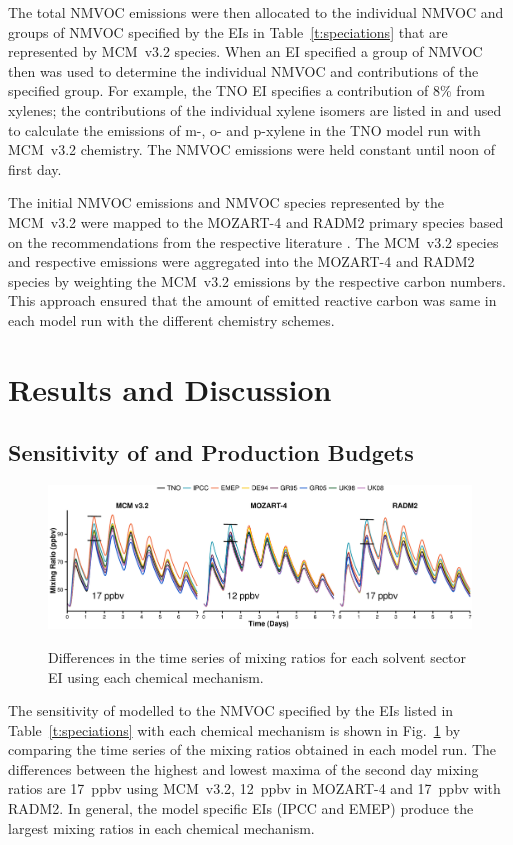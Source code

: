 \documentclass[14pt]{extarticle}
\begin{document}
The total NMVOC emissions were then allocated to the individual NMVOC and groups of NMVOC specified by the EIs in Table~\ref{t:speciations} that are represented by MCM~v3.2 species.
When an EI specified a group of NMVOC then \citet{Passant:2002} was used to determine the individual NMVOC and contributions of the specified group.
For example, the TNO EI specifies a contribution of $8$\% from xylenes; the contributions of the individual xylene isomers are listed in \citet{Passant:2002} and used to calculate the emissions of m-, o- and p-xylene in the TNO model run with MCM~v3.2 chemistry.  
The NMVOC emissions were held constant until noon of first day.

The initial NMVOC emissions and NMVOC species represented by the MCM~v3.2 were mapped to the MOZART-4 and RADM2 primary species based on the recommendations from the respective literature \citep{Emmons:2010, Stockwell:1990}.
The MCM~v3.2 species and respective emissions were aggregated into the MOZART-4 and RADM2 species by weighting the MCM~v3.2 emissions by the respective carbon numbers.
This approach ensured that the amount of emitted reactive carbon was same in each model run with the different chemistry schemes.

\section{Results and Discussion}

\subsection[Sensitivity of O3 and Ox Production Budgets]{Sensitivity of  and  Production Budgets} \label{ss:o3}
\begin{figure}
    \centering
    \caption{Differences in the time series of  mixing ratios for each solvent sector EI using each chemical mechanism.}
    \includegraphics[width=\textwidth]{Pictures/Solvents_Only_O3_mixing_ratios}
    \label{f:O3_time_series}
    \vspace{-2mm}
\end{figure}
The sensitivity of modelled  to the NMVOC specified by the EIs listed in Table~\ref{t:speciations} with each chemical mechanism is shown in Fig.~\ref{f:O3_time_series} by comparing the time series of the  mixing ratios obtained in each model run.
The differences between the highest and lowest maxima of the second day  mixing ratios are 17~ppbv using MCM~v3.2, 12~ppbv in MOZART-4 and 17~ppbv with RADM2.
In general, the model specific EIs (IPCC and EMEP) produce the largest  mixing ratios in each chemical mechanism.
\end{document}
